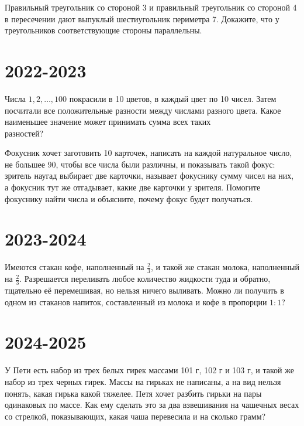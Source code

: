 \documentclass[11pt, a4paper]{../problems_template}
\begin{document}
\begin{exercise}[19]
Правильный треугольник со стороной 3 и правильный треугольник со стороной 4 в пересечении дают выпуклый шестиугольник периметра 7. Докажите, что у треугольников соответствующие стороны параллельны.
\end{exercise}

\chapter{2022-2023}

\begin{exercise}[12]
Числа $1, 2, \dots, 100$ покрасили в 10 цветов, в каждый цвет по 10 чисел. Затем посчитали все положительные разности между числами разного цвета. Какое наименьшее значение может принимать сумма всех таких \\ разностей?
\end{exercise}

\begin{exercise}[30]
Фокусник хочет заготовить 10 карточек, написать на каждой натуральное число, не большее 90, чтобы все числа были различны, и показывать такой фокус: зритель наугад выбирает две карточки,
называет фокуснику сумму чисел на них, а фокусник тут же отгадывает, какие две карточки у зрителя. Помогите фокуснику найти числа и объясните, почему фокус будет получаться.
\end{exercise}

\chapter{2023-2024}

\begin{exercise}[6]
Имеются стакан кофе, наполненный на $\frac{2}{3}$, и такой же стакан молока, наполненный на $\frac{2}{3}$. Разрешается переливать любое количество жидкости туда и обратно, тщательно её перемешивая, но нельзя ничего выливать. Можно ли получить в одном из стаканов напиток, составленный из молока и кофе в пропорции $1 : 1$?
\end{exercise}

\chapter{2024-2025}

\begin{exercise}[2]
У Пети есть набор из трех белых гирек массами 101 г, 102 г и 103 г, и такой же набор из трех черных гирек. Массы на гирьках не написаны, а на вид нельзя понять, какая гирька какой тяжелее. Петя хочет разбить гирьки на пары одинаковых по массе. Как ему сделать это за два взвешивания на чашечных весах со стрелкой, показывающих, какая чаша перевесила и на сколько грамм?
\end{exercise}
\end{document}
